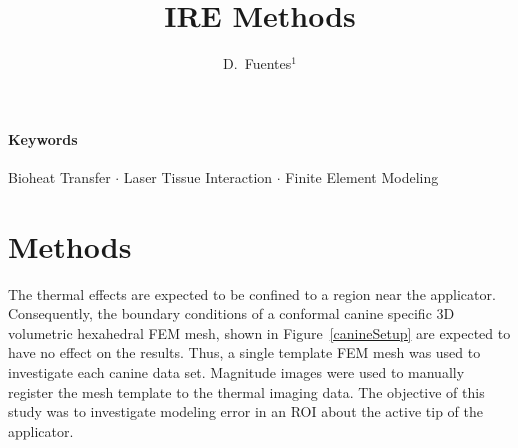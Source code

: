\documentclass{article}
\begin{document}
\title{\bf \Large
IRE Methods
}

\author{ D.~Fuentes$^1$
}




\maketitle

\paragraph{Keywords} Bioheat Transfer $\cdot$ 
                     Laser Tissue Interaction $\cdot$ 
                     Finite Element Modeling

\section{Methods}


The thermal effects are expected to be confined to a region near
the applicator. Consequently, the boundary conditions of a
conformal canine specific 3D volumetric hexahedral FEM mesh, shown
in Figure~\ref{canineSetup} are expected to have no effect on the
results.  Thus, a single template FEM mesh was used to investigate
each canine data set. Magnitude images were used to manually
register the mesh template to the thermal imaging data.  The
objective of this study was to investigate modeling error in an ROI
about the active tip of the applicator.  
\end{document}
